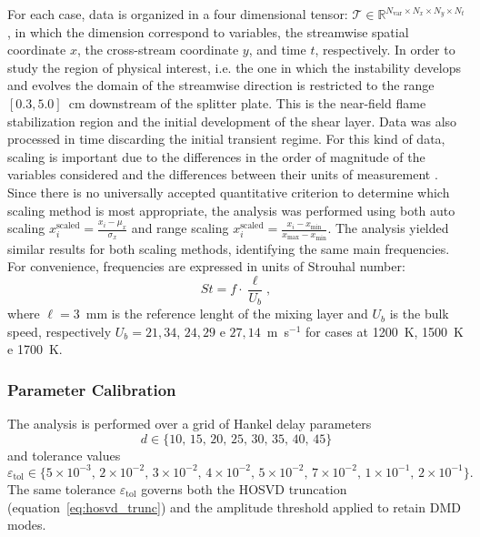 For each case, data is organized in a four dimensional tensor: $\mathcal{T} \in \mathbb{R}^{N_{\mathrm{var}} \times N_x \times N_y \times N_t}$, in which the dimension correspond to variables, the streamwise spatial coordinate $x$, the cross-stream coordinate $y$, and time $t$, respectively.
In order to study the region of physical interest, i.e. the one in which the instability develops and evolves the domain of the streamwise direction is restricted to the range $[0.3, 5.0]$~cm downstream of the splitter plate. This is the near-field flame stabilization region and the initial development of the shear layer. Data was also processed in time discarding the initial transient regime.
For this kind of data, scaling is important due to the differences in the order of magnitude of the variables considered and the differences between their units of measurement \cite{corrochano2023higher, parente2013principal}. Since there is no universally accepted quantitative criterion to determine which scaling method is most appropriate, the analysis was performed using both auto scaling $x_{i}^{\text{scaled}} = \frac{x_i - \mu_x}{\sigma_x}$ and range scaling $x_{i}^{\text{scaled}} = \frac{x_i - x_{\min}}{x_{\max} - x_{\min}}$. The analysis yielded similar results for both scaling methods, identifying the same main frequencies.
For convenience, frequencies are expressed in units of Strouhal number:
\begin{equation}
    St = f \cdot \frac{\ell}{U_b},
\label{eq:strouhal}
\end{equation}
where $\ell = 3$~mm is the reference lenght of the mixing layer and  $U_b$ is the bulk speed, respectively $U_b = 21{,}34$, $24{,}29$ e $27{,}14$~m~s$^{-1}$ for cases at 1200~K, 1500~K e 1700~K.

\subsubsection{Parameter Calibration}
\label{sec:coria_params}

The analysis is performed over a grid of Hankel delay parameters
\begin{equation}
    d \in \{10,\, 15,\, 20,\, 25,\, 30,\, 35,\, 40,\, 45\}
    \label{eq:d_values}
\end{equation}
and tolerance values
\begin{equation}
    \varepsilon_{\mathrm{tol}} \in
    \{5\times10^{-3},\, 2\times10^{-2},\, 3\times10^{-2},\, 4\times10^{-2},\,
      5\times10^{-2},\, 7\times10^{-2},\, 1\times10^{-1},\, 2\times10^{-1}\}.
    \label{eq:tol_values}
\end{equation}
The same tolerance $\varepsilon_{\mathrm{tol}}$ governs both the HOSVD truncation (equation~\eqref{eq:hosvd_trunc}) and the amplitude threshold applied to retain DMD modes.

